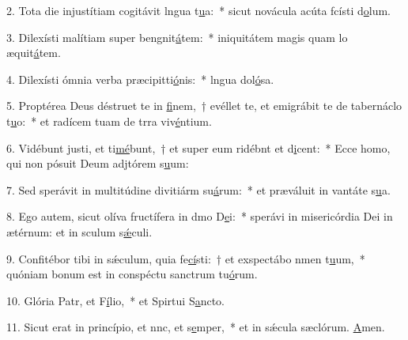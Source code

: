 2. Tota die injustítiam cogitávit lngua t\uline{u}a:~* sicut novácula acúta fcísti d\uline{o}lum.\par 
3. Dilexísti malítiam super bengnit\uline{á}tem:~* iniquitátem magis quam lo æquit\uline{á}tem.\par 
4. Dilexísti ómnia verba præcipitti\uline{ó}nis:~* lngua dol\uline{ó}sa.\par 
5. Proptérea Deus déstruet te in \uline{fi}nem,~† evéllet te, et emigrábit te de tabernáclo t\uline{u}o:~* et radícem tuam de trra viv\uline{é}ntium.\par 
6. Vidébunt justi, et ti\uline{mé}bunt,~† et super eum ridébnt et d\uline{i}cent:~* Ecce homo, qui non pósuit Deum adjtórem s\uline{u}um:\par 
7. Sed sperávit in multitúdine divitiárm su\uline{á}rum:~* et præváluit in vantáte s\uline{u}a.\par 
8. Ego autem, sicut olíva fructífera in dmo D\uline{e}i:~* sperávi in misericórdia Dei in ætérnum: et in sculum s\uline{ǽ}culi.\par 
9. Confitébor tibi in sǽculum, quia fe\uline{cí}sti:~† et exspectábo nmen t\uline{u}um,~* quóniam bonum est in conspéctu sanctrum tu\uline{ó}rum.\par 
10. Glória Patr, et F\uline{í}lio,~* et Spirtui S\uline{a}ncto.\par 
11. Sicut erat in princípio, et nnc, et s\uline{e}mper,~* et in sǽcula sæclórum. \uline{A}men.\par 

